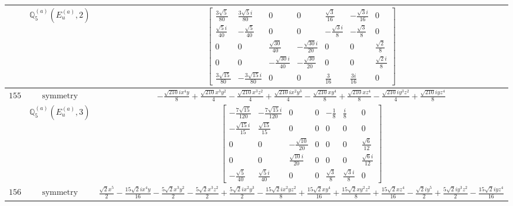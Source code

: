\documentclass[fleqn,8pt,landscape]{jsarticle}
\begin{document}
\begin{longtable}{ccc}
$  $ & $ \mathbb{Q}_{5}^{(a)}(E_{u}^{(a)},2) $ & $ \begin{bmatrix} \frac{3 \sqrt{5}}{80} & \frac{3 \sqrt{5} i}{80} & 0 & 0 & \frac{\sqrt{3}}{16} & - \frac{\sqrt{3} i}{16} & 0 \\ \frac{\sqrt{5} i}{40} & - \frac{\sqrt{5}}{40} & 0 & 0 & - \frac{\sqrt{3} i}{8} & - \frac{\sqrt{3}}{8} & 0 \\ 0 & 0 & \frac{\sqrt{30}}{40} & - \frac{\sqrt{30} i}{20} & 0 & 0 & \frac{\sqrt{2}}{8} \\ 0 & 0 & - \frac{\sqrt{30} i}{40} & - \frac{\sqrt{30}}{20} & 0 & 0 & \frac{\sqrt{2} i}{8} \\ \frac{3 \sqrt{15}}{80} & - \frac{3 \sqrt{15} i}{80} & 0 & 0 & \frac{3}{16} & \frac{3 i}{16} & 0 \end{bmatrix} $ \\ \hline
$ 155 $ & $ \text{symmetry} $ & $ - \frac{\sqrt{210} i x^{4} y}{8} + \frac{\sqrt{210} x^{3} y^{2}}{4} - \frac{\sqrt{210} x^{3} z^{2}}{4} + \frac{\sqrt{210} i x^{2} y^{3}}{4} - \frac{\sqrt{210} x y^{4}}{8} + \frac{\sqrt{210} x z^{4}}{8} - \frac{\sqrt{210} i y^{3} z^{2}}{4} + \frac{\sqrt{210} i y z^{4}}{8} $ \\
$  $ & $ \mathbb{Q}_{5}^{(a)}(E_{u}^{(a)},3) $ & $ \begin{bmatrix} - \frac{7 \sqrt{15}}{120} & - \frac{7 \sqrt{15} i}{120} & 0 & 0 & - \frac{1}{8} & \frac{i}{8} & 0 \\ - \frac{\sqrt{15} i}{15} & \frac{\sqrt{15}}{15} & 0 & 0 & 0 & 0 & 0 \\ 0 & 0 & - \frac{\sqrt{10}}{20} & 0 & 0 & 0 & \frac{\sqrt{6}}{12} \\ 0 & 0 & \frac{\sqrt{10} i}{20} & 0 & 0 & 0 & \frac{\sqrt{6} i}{12} \\ - \frac{\sqrt{5}}{40} & \frac{\sqrt{5} i}{40} & 0 & 0 & \frac{\sqrt{3}}{8} & \frac{\sqrt{3} i}{8} & 0 \end{bmatrix} $ \\ \hline
$ 156 $ & $ \text{symmetry} $ & $ \frac{\sqrt{2} x^{5}}{2} - \frac{15 \sqrt{2} i x^{4} y}{16} - \frac{5 \sqrt{2} x^{3} y^{2}}{2} - \frac{5 \sqrt{2} x^{3} z^{2}}{2} + \frac{5 \sqrt{2} i x^{2} y^{3}}{2} - \frac{15 \sqrt{2} i x^{2} y z^{2}}{8} + \frac{15 \sqrt{2} x y^{4}}{16} + \frac{15 \sqrt{2} x y^{2} z^{2}}{8} + \frac{15 \sqrt{2} x z^{4}}{16} - \frac{\sqrt{2} i y^{5}}{2} + \frac{5 \sqrt{2} i y^{3} z^{2}}{2} - \frac{15 \sqrt{2} i y z^{4}}{16} $ \\

\end{longtable}
\end{document}
